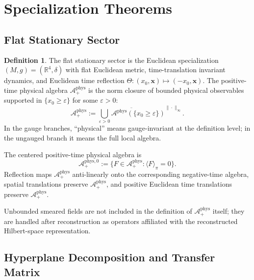 \documentclass[12pt,a4paper]{article}
\theoremstyle{plain}
\theoremstyle{definition}
\newtheorem{definition}[theorem]{Definition}
\theoremstyle{remark}
\newcommand{\real}{\mathbb{R}}
\newcommand{\alg}{\mathcal{A}}
\begin{document}
\section{Specialization Theorems}
\label{sec:specialization}

\subsection{Flat Stationary Sector}

\begin{definition}\label{def:flat}
  The flat stationary sector is the Euclidean specialization
  $(M,g) = (\real^4, \delta)$ with flat Euclidean metric,
  time-translation invariant dynamics, and Euclidean time reflection
  $\Theta: (x_0, \mathbf{x}) \mapsto (-x_0, \mathbf{x})$. The
  positive-time physical algebra $\alg^{\mathrm{phys}}_+$ is the norm
  closure of bounded physical observables supported in
  $\{x_0 \ge \varepsilon\}$ for some $\varepsilon > 0$:
  \[
    \alg^{\mathrm{phys}}_+
    := \overline{\bigcup_{\varepsilon>0}
    \alg^{\mathrm{phys}}(\{x_0\ge \varepsilon\})}^{\|\cdot\|_\infty}.
  \]
  In the gauge branches, ``physical'' means gauge-invariant at the
  definition level; in the ungauged branch it means the full local
  algebra.

  The centered positive-time physical algebra is
  \[
    \alg^{\mathrm{phys},0}_+
    := \{F \in \alg^{\mathrm{phys}}_+:
    \langle F\rangle_\pi = 0\}.
  \]
  Reflection maps $\alg^{\mathrm{phys}}_+$ anti-linearly onto the
  corresponding negative-time algebra, spatial translations preserve
  $\alg^{\mathrm{phys}}_+$, and positive Euclidean time translations
  preserve $\alg^{\mathrm{phys}}_+$.

  Unbounded smeared fields are not included in the definition of
  $\alg^{\mathrm{phys}}_+$ itself; they are handled after
  reconstruction as operators affiliated with the reconstructed
  Hilbert-space representation.
\end{definition}


\subsection{Hyperplane Decomposition and Transfer Matrix}
\end{document}
